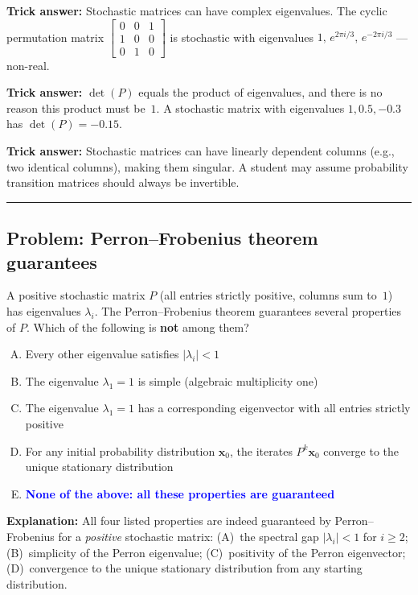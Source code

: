 \documentclass[12pt]{amsart}
\newcommand{\divider}{
  \vspace{-1em}
  \noindent
  \raisebox{-0.15ex}{\textbullet}%
  \hspace{0.5em}%
  \rule[0.5ex]{0.95\textwidth}{1.0pt}%
  \hspace{0.5em}%
  \raisebox{-0.15ex}{\textbullet}%
  \vspace{0em}
}
\begin{document}
\textbf{Trick answer:}
Stochastic matrices can have complex eigenvalues. The cyclic permutation
matrix $\begin{bmatrix} 0&0&1\\1&0&0\\0&1&0 \end{bmatrix}$ is stochastic
with eigenvalues $1,\, e^{2\pi i/3},\, e^{-2\pi i/3}$ --- non-real.

\textbf{Trick answer:}
$\det(P)$ equals the product of eigenvalues, and there is no reason this
product must be~$1$. A stochastic matrix with eigenvalues $1, 0.5, -0.3$
has $\det(P) = -0.15$.

\textbf{Trick answer:}
Stochastic matrices can have linearly dependent columns (e.g., two
identical columns), making them singular. A student may assume probability
transition matrices should always be invertible.

\divider

\subsection*{Problem: Perron--Frobenius theorem guarantees}

A positive stochastic matrix $P$ (all entries strictly positive, columns
sum to~$1$) has eigenvalues $\lambda_i$.
The Perron--Frobenius theorem guarantees several properties of $P$.
Which of the following is \textbf{not} among them?

\begin{enumerate}[(A)]
\item Every other eigenvalue satisfies $|\lambda_i| < 1$
\item The eigenvalue $\lambda_1 = 1$ is simple (algebraic multiplicity one)
\item The eigenvalue $\lambda_1 = 1$ has a corresponding eigenvector with
      all entries strictly positive
\item For any initial probability distribution $\mathbf{x}_0$, the iterates
      $P^k\mathbf{x}_0$ converge to the unique stationary distribution
\item \textcolor{blue}{\textbf{None of the above: all these properties are
      guaranteed}}
\end{enumerate}

\textbf{Explanation:}
All four listed properties are indeed guaranteed by Perron--Frobenius for
a \emph{positive} stochastic matrix:
(A)~the spectral gap $|\lambda_i| < 1$ for $i \geq 2$;
(B)~simplicity of the Perron eigenvalue;
(C)~positivity of the Perron eigenvector;
(D)~convergence to the unique stationary distribution from any starting
distribution.
\end{document}
